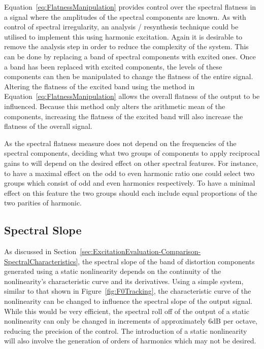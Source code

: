 		Equation~\ref{eq:FlatnessManipulation} provides control over the spectral flatness in a signal where the
		amplitudes of the spectral components are known. As with control of spectral irregularity, an analysis /
		resynthesis technique could be utilised to implement this using harmonic excitation.  Again it is desirable
		to remove the analysis step in order to reduce the complexity of the system.  This can be done by replacing
		a band of spectral components with excited ones. Once a band has been replaced with excited components, the
		levels of these components can then be manipulated to change the flatness of the entire signal. Altering
		the flatness of the excited band using the method in Equation~\ref{eq:FlatnessManipulation} allows the
		overall flatness of the output to be influenced. Because this method only alters the arithmetic mean of the
		components, increasing the flatness of the excited band will also increase the flatness of the overall
		signal.

		As the spectral flatness measure does not depend on the frequencies of the spectral components, deciding
		what two groups of components to apply reciprocal gains to will depend on the desired effect on other
		spectral features. For instance, to have a maximal effect on the odd to even harmonic ratio one could
		select two groups which consist of odd and even harmonics respectively. To have a minimal effect on this
		feature the two groups should each include equal proportions of the two parities of harmonic.

	\subsection{Spectral Slope}
	\label{sec:FeatureControl-Parameterisation-Slope}
		As discussed in Section~\ref{sec:ExcitationEvaluation-Comparison-SpectralCharacteristics}, the spectral
		slope of the band of distortion components generated using a static nonlinearity depends on the continuity
		of the nonlinearity's characteristic curve and its derivatives. Using a simple system, similar to that
		shown in Figure~\ref{fig:F0Tracking}, the characteristic curve of the nonlinearity can be changed to
		influence the spectral slope of the output signal. While this would be very efficient, the spectral roll
		off of the output of a static nonlinearity can only be changed in increments of approximately 6dB per
		octave, reducing the precision of the control. The introduction of a static nonlinearity will also involve
		the generation of orders of harmonics which may not be desired.

